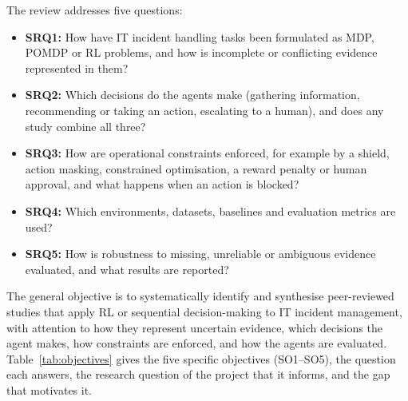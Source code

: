 \documentclass[journal]{IEEEtran}
\begin{document}
The review addresses five questions:
\begin{itemize}
\item \textbf{SRQ1:} How have IT incident handling tasks been formulated as MDP, POMDP or RL problems, and how is incomplete or conflicting evidence represented in them?
\item \textbf{SRQ2:} Which decisions do the agents make (gathering information, recommending or taking an action, escalating to a human), and does any study combine all three?
\item \textbf{SRQ3:} How are operational constraints enforced, for example by a shield, action masking, constrained optimisation, a reward penalty or human approval, and what happens when an action is blocked?
\item \textbf{SRQ4:} Which environments, datasets, baselines and evaluation metrics are used?
\item \textbf{SRQ5:} How is robustness to missing, unreliable or ambiguous evidence evaluated, and what results are reported?
\end{itemize}

The general objective is to systematically identify and synthesise peer-reviewed studies that apply RL or sequential decision-making to IT incident management, with attention to how they represent uncertain evidence, which decisions the agent makes, how constraints are enforced, and how the agents are evaluated. Table~\ref{tab:objectives} gives the five specific objectives (SO1--SO5), the question each answers, the research question of the project that it informs, and the gap that motivates it.
\end{document}
